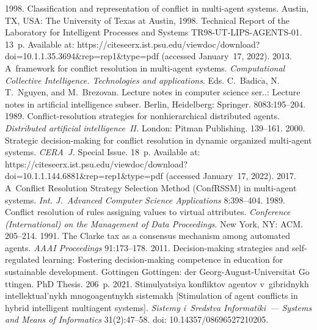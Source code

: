 \begin{multicols}{2}
{{\begin{thebibliography}{99}
    1998. Classification and 
representation of conflict in multi-agent systems.
Austin, TX, USA: The University of Texas at Austin, 
1998. Technical Report of the Laboratory for Intelligent Processes and 
Systems TR98-UT-LIPS-AGENTS-01. 13~p.  Available at: {\sf 
https://citeseerx.\linebreak  ist.psu.edu/viewdoc/download?doi=10.1.1.35.3694\&\linebreak rep=rep1\&type=pdf} 
(accessed January~17, 2022).
    2013. A~framework for conflict 
resolution in multi-agent systems. \textit{Computational Collective Intelligence. Technologies and 
applications}. Eds. C.~B$\grave{\mbox{a}}$dic$\grave{\mbox{a}}$, N.\,T.~Nguyen, and 
M.~Brezovan. Lecture notes in computer science ser..: Lecture notes in artificial intelligence 
subser. Berlin, Heidelberg: Springer. 8083:195--204.
    1989.  
Conflict-resolution strategies for nonhierarchical distributed agents. \textit{Distributed artificial 
intelligence~II.} London: Pitman Publishing. 139--161. 
    2000. Strategic decision-making for conflict 
resolution in dynamic organized multi-agent systems. \textit{CERA~J.} Special Issue. 18~p.
Available at: {\sf 
https://citeseerx.ist.psu.edu/\linebreak viewdoc/download?doi=10.1.1.144.6881\&rep=rep1\&\linebreak type=pdf} 
(accessed January~17, 2022).
    2017. A~Conflict Resolution Strategy Selection Method 
(ConfRSSM) in multi-agent systems. \textit{Int. J.~Advanced Computer Science Applications} 
8:398--404.
    1989. Conflict resolution of rules assigning values to 
virtual attributes. \textit{Conference (International) on the Management of Data Proceedings}. 
New York, NY: ACM. 205--214.
    1991. The Clarke tax as a consensus mechanism among 
automated agents. \textit{AAAI Proceedings} 91:173--178.
    2011. Decision-making strategies and self-regulated learning: Fostering 
decision-making competence in education for sustainable development. 
G$\ddot{\mbox{o}}$ttingen G$\ddot{\mbox{o}}$ttingen: der 
Georg-August-Universit$\ddot{\mbox{a}}$t G$\ddot{\mbox{o}}$ttingen. PhD Thesis. 206~p.
    2021. Stimulyatsiya konfliktov agentov 
v~gibridnykh intellektual'nykh mnogoagentnykh sistemakh [Stimulation of agent conflicts in hybrid 
intelligent multiagent systems]. \textit{Sistemy i~Sredstva Informatiki~--- Systems and Means of 
Informatics} 31(2):47--58. doi: 10.14357/08696527210205.
   \end{thebibliography}

 }
 }

\end{multicols}


